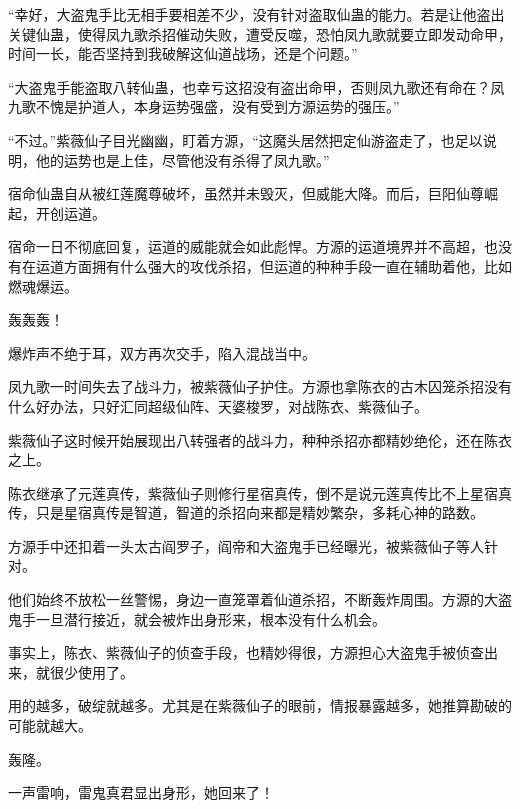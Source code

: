 \begin{this_body}
“幸好，大盗鬼手比无相手要相差不少，没有针对盗取仙蛊的能力。若是让他盗出关键仙蛊，使得凤九歌杀招催动失败，遭受反噬，恐怕凤九歌就要立即发动命甲，时间一长，能否坚持到我破解这仙道战场，还是个问题。”

“大盗鬼手能盗取八转仙蛊，也幸亏这招没有盗出命甲，否则凤九歌还有命在？凤九歌不愧是护道人，本身运势强盛，没有受到方源运势的强压。”

“不过。”紫薇仙子目光幽幽，盯着方源，“这魔头居然把定仙游盗走了，也足以说明，他的运势也是上佳，尽管他没有杀得了凤九歌。”

宿命仙蛊自从被红莲魔尊破坏，虽然并未毁灭，但威能大降。而后，巨阳仙尊崛起，开创运道。

宿命一日不彻底回复，运道的威能就会如此彪悍。方源的运道境界并不高超，也没有在运道方面拥有什么强大的攻伐杀招，但运道的种种手段一直在辅助着他，比如燃魂爆运。

轰轰轰！

爆炸声不绝于耳，双方再次交手，陷入混战当中。

凤九歌一时间失去了战斗力，被紫薇仙子护住。方源也拿陈衣的古木囚笼杀招没有什么好办法，只好汇同超级仙阵、天婆梭罗，对战陈衣、紫薇仙子。

紫薇仙子这时候开始展现出八转强者的战斗力，种种杀招亦都精妙绝伦，还在陈衣之上。

陈衣继承了元莲真传，紫薇仙子则修行星宿真传，倒不是说元莲真传比不上星宿真传，只是星宿真传是智道，智道的杀招向来都是精妙繁杂，多耗心神的路数。

方源手中还扣着一头太古阎罗子，阎帝和大盗鬼手已经曝光，被紫薇仙子等人针对。

他们始终不放松一丝警惕，身边一直笼罩着仙道杀招，不断轰炸周围。方源的大盗鬼手一旦潜行接近，就会被炸出身形来，根本没有什么机会。

事实上，陈衣、紫薇仙子的侦查手段，也精妙得很，方源担心大盗鬼手被侦查出来，就很少使用了。

用的越多，破绽就越多。尤其是在紫薇仙子的眼前，情报暴露越多，她推算勘破的可能就越大。

轰隆。

一声雷响，雷鬼真君显出身形，她回来了！

\end{this_body}

